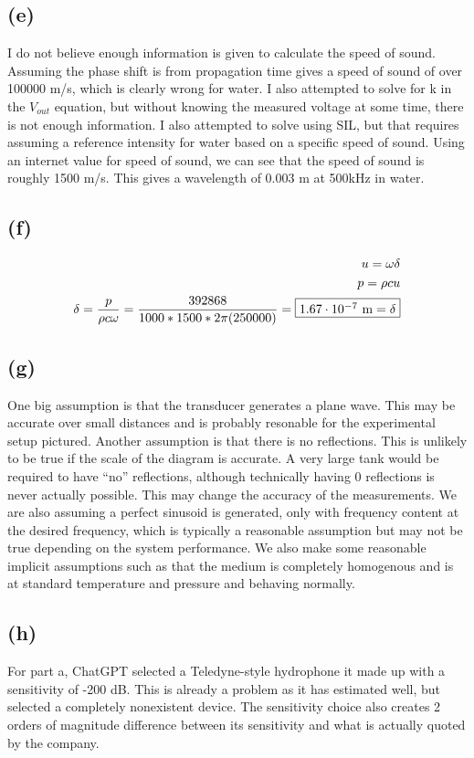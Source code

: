 \documentclass[12 pt]{article}
\begin{document}
\subsection*{(e)}
I do not believe enough information is given to calculate the speed of sound. Assuming the phase shift is from
propagation time gives a speed of sound of over 100000 m/s, which is clearly wrong for water. I also attempted to solve
for k in the $V_{out}$ equation, but without knowing the measured voltage at some time, there is not enough information.
I also attempted to solve using SIL, but that requires assuming a reference intensity for water based on a specific
speed of sound. Using an internet value for speed of sound, we can see that the speed of sound is roughly 1500 m/s. This
gives a wavelength of 0.003 m at 500kHz in water.

\subsection*{(f)}
\begin{align*}
    u = \omega \delta \\
    p = \rho c u \\
    \delta = \frac{p}{\rho c\omega}=\frac{392868}{1000*1500*2\pi(250000)}=\fbox{$1.67\cdot 10^{-7}\text{ m}=\delta$}
\end{align*}

\subsection*{(g)}
One big assumption is that the transducer generates a plane wave. This may be accurate over small distances and is
probably resonable for the experimental setup pictured. Another assumption is that there is no reflections. This is
unlikely to be true if the scale of the diagram is accurate. A very large tank would be required to have ``no''
reflections, although technically having 0 reflections is never actually possible. This may change the accuracy of the
measurements. We are also assuming a perfect sinusoid is generated, only with frequency content at the desired
frequency, which is typically a reasonable assumption but may not be true depending on the system performance. We also
make some reasonable implicit assumptions such as that the medium is completely homogenous and is at standard
temperature and pressure and behaving normally.

\subsection*{(h)}
For part a, ChatGPT selected a Teledyne-style hydrophone it made up with a sensitivity of -200 dB. This is already a
problem as it has estimated well, but selected a completely nonexistent device. The sensitivity choice also creates 2
orders of magnitude difference between its sensitivity and what is actually quoted by the company.
\end{document}
